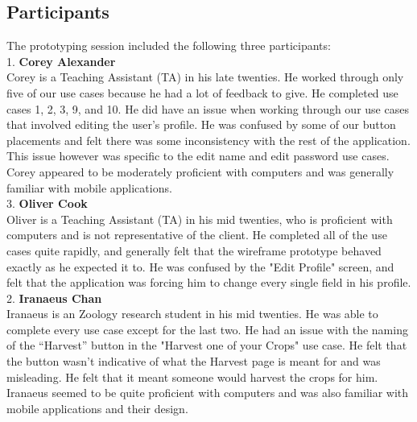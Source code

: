 \documentclass[12pt,letterpaper]{article}
\begin{document}
\subsection{Participants}
The prototyping session included the following three participants:\\
1.\hspace*{8pt} \textbf{Corey Alexander}\\
Corey is a Teaching Assistant (TA) in his late twenties. He worked through only five of our use cases because he had a lot of feedback to give. He completed use cases 1, 2, 3, 9, and 10. He did have an issue when working through our use cases that involved editing the user's profile. He was confused by some of our button placements and felt there was some inconsistency with the rest of the application. This issue however was specific to the edit name and edit password use cases. Corey appeared to be moderately proficient with computers and was generally familiar with mobile applications.\\[0.5\baselineskip]
3.\hspace*{8pt} \textbf{Oliver Cook}\\
Oliver is a Teaching Assistant (TA) in his mid twenties, who is proficient with computers and is not representative of the client. He completed all of the use cases quite rapidly, and generally felt that the wireframe prototype behaved exactly as he expected it to. He was confused by the "Edit Profile" screen, and felt that the application was forcing him to change every single field in his profile.\\[0.5\baselineskip]
2.\hspace*{8pt} \textbf{Iranaeus Chan}\\
Iranaeus is an Zoology research student in his mid twenties. He was able to complete every use case except for the last two. He had an issue with the naming of the “Harvest” button in the "Harvest one of your Crops" use case. He felt that the button wasn’t indicative of what the Harvest page is meant for and was misleading. He felt that it meant someone would harvest the crops for him. Iranaeus seemed to be quite proficient with computers and was also familiar with mobile applications and their design.\\[0.5\baselineskip]

\clearpage
\end{document}
